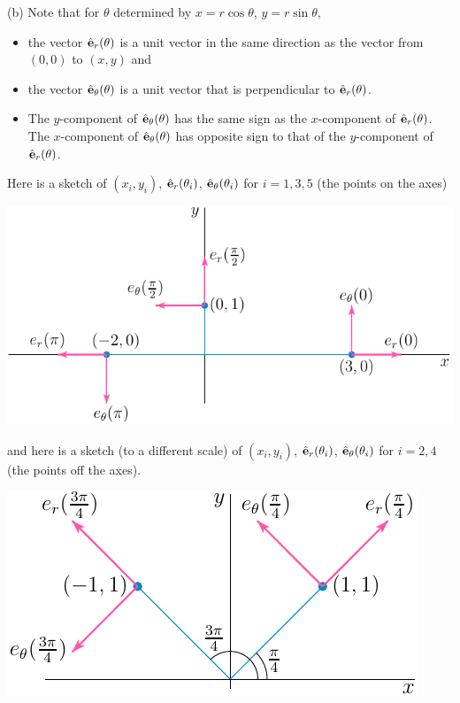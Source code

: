 \begin{solution}
(b) Note that for $\theta$ determined by $x=r\cos\theta$, $y=r\sin\theta$,
\begin{itemize}\itemsep1pt \parskip0pt  %
\item
the vector $\hat{\mathbf{e}}_r(\theta)$ is a unit vector in the same direction as the
vector from $(0,0)$ to $(x,y)$ and 
\item
the vector $\hat{\mathbf{e}}_\theta(\theta)$ is a unit vector that is perpendicular 
to $\hat{\mathbf{e}}_r(\theta)$. 
\item
The $y$-component of $\hat{\mathbf{e}}_\theta(\theta)$ has the same sign 
as the $x$-component of $\hat{\mathbf{e}}_r(\theta)$.
The $x$-component of $\hat{\mathbf{e}}_\theta(\theta)$ has opposite sign to that of the $y$-component  of $\hat{\mathbf{e}}_r(\theta)$. 
\end{itemize}
Here is a sketch of $(x_i,y_i)$, $\hat{\mathbf{e}}_r(\theta_i)$,
$\hat{\mathbf{e}}_\theta(\theta_i)$ for $i =1,3,5$ (the points on the axes)
\begin{center}
  \includegraphics{fig/polar3.pdf}
\end{center}
and here is a sketch (to a different scale) of $(x_i,y_i)$, $\hat{\mathbf{e}}_r(\theta_i)$,
$\hat{\mathbf{e}}_\theta(\theta_i)$ for $i =2,4$ (the points off the axes).
\begin{center}       
  \includegraphics{fig/polar2.pdf}
\end{center}
\end{solution}

